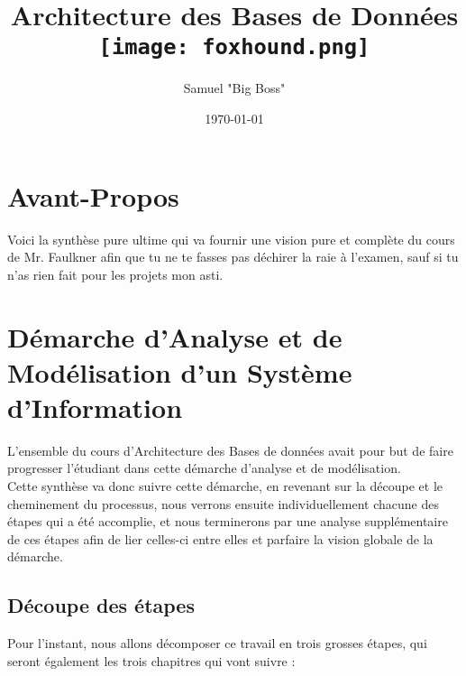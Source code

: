 \documentclass{report}
\title{Architecture des Bases de Données\\\texttt{[image: foxhound.png]}}
\author{Samuel "Big Boss" \bsc{Monroe}}
\date{\today}
\begin{document}
\maketitle

\newpage
\thispagestyle{empty}
\mbox{}

\tableofcontents

\chapter{Avant-Propos}

	Voici la synthèse pure ultime qui va fournir une vision pure et complète du cours de Mr. Faulkner afin que tu ne te fasses pas déchirer la raie à l'examen, sauf si tu n'as rien fait pour les projets mon asti.\\

\chapter{Démarche d'Analyse et de Modélisation d'un Système d'Information}

	L'ensemble du cours d'Architecture des Bases de données avait pour but de faire progresser l'étudiant dans cette démarche d'analyse et de modélisation.\\
	Cette synthèse va donc suivre cette démarche, en revenant sur la découpe et le cheminement du processus, nous verrons ensuite individuellement chacune des étapes qui a été accomplie, et nous terminerons par une analyse supplémentaire de ces étapes afin de lier celles-ci entre elles et parfaire la vision globale de la démarche.\\

	\section{Découpe des étapes}

		Pour l'instant, nous allons décomposer ce travail en trois grosses étapes, qui seront également les trois chapitres qui vont suivre : \\
\end{document}
